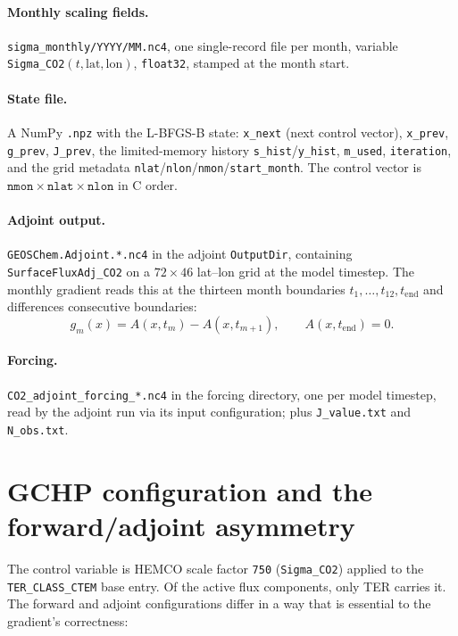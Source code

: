 \documentclass[11pt]{article}
\newcommand{\code}[1]{\texttt{#1}}
\begin{document}
\paragraph{Monthly scaling fields.} \code{sigma\_monthly/YYYY/MM.nc4}, one
single-record file per month, variable \code{Sigma\_CO2}$(t,\mathrm{lat},
\mathrm{lon})$, \code{float32}, stamped at the month start.

\paragraph{State file.} A NumPy \code{.npz} with the L-BFGS-B state:
\code{x\_next} (next control vector), \code{x\_prev}, \code{g\_prev},
\code{J\_prev}, the limited-memory history \code{s\_hist}/\code{y\_hist},
\code{m\_used}, \code{iteration}, and the grid metadata
\code{nlat}/\code{nlon}/\code{nmon}/\code{start\_month}. The control vector is
$\code{nmon}\times\code{nlat}\times\code{nlon}$ in C order.

\paragraph{Adjoint output.} \code{GEOSChem.Adjoint.*.nc4} in the adjoint
\code{OutputDir}, containing \code{SurfaceFluxAdj\_CO2} on a $72\times46$ lat--lon
grid at the model timestep. The monthly gradient reads this at the thirteen month
boundaries $t_1,\dots,t_{12},t_{\mathrm{end}}$ and differences consecutive
boundaries:
%
\begin{equation}
  g_m(x) = A(x,t_m) - A(x,t_{m+1}),\qquad A(x,t_{\mathrm{end}})=0.
  \label{eq:gm}
\end{equation}

\paragraph{Forcing.} \code{CO2\_adjoint\_forcing\_*.nc4} in the forcing directory,
one per model timestep, read by the adjoint run via its input configuration; plus
\code{J\_value.txt} and \code{N\_obs.txt}.

\section{GCHP configuration and the forward/adjoint asymmetry}

The control variable is HEMCO scale factor \code{750} (\code{Sigma\_CO2}) applied
to the \code{TER\_CLASS\_CTEM} base entry. Of the active flux components, only TER
carries it. The forward and adjoint configurations differ in a way that is
essential to the gradient's correctness:
\end{document}
